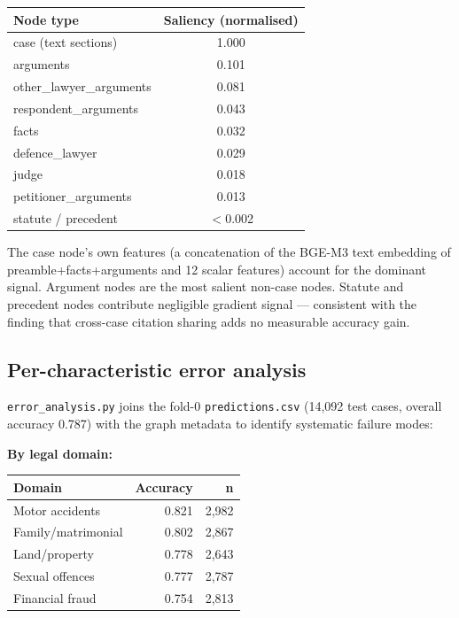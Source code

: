 \documentclass[12pt,a4paper]{article}
\begin{document}
\begin{center}
\begin{tabular}{lc}
\toprule
\textbf{Node type} & \textbf{Saliency (normalised)} \\
\midrule
case (text sections) & 1.000 \\
arguments            & 0.101 \\
other\_lawyer\_arguments & 0.081 \\
respondent\_arguments & 0.043 \\
facts                & 0.032 \\
defence\_lawyer      & 0.029 \\
judge                & 0.018 \\
petitioner\_arguments & 0.013 \\
statute / precedent  & $<$0.002 \\
\bottomrule
\end{tabular}
\end{center}

The case node's own features (a concatenation of the BGE-M3 text embedding of preamble+facts+arguments and 12 scalar features) account for the dominant signal. Argument nodes are the most salient non-case nodes. Statute and precedent nodes contribute negligible gradient signal — consistent with the finding that cross-case citation sharing adds no measurable accuracy gain.

\subsection{Per-characteristic error analysis}

\texttt{error\_analysis.py} joins the fold-0 \texttt{predictions.csv} (14{,}092 test cases, overall accuracy 0.787) with the graph metadata to identify systematic failure modes:

\textbf{By legal domain:}
\begin{center}
\begin{tabular}{lrr}
\toprule
\textbf{Domain} & \textbf{Accuracy} & \textbf{n} \\
\midrule
Motor accidents  & 0.821 & 2{,}982 \\
Family/matrimonial & 0.802 & 2{,}867 \\
Land/property    & 0.778 & 2{,}643 \\
Sexual offences  & 0.777 & 2{,}787 \\
Financial fraud  & 0.754 & 2{,}813 \\
\bottomrule
\end{tabular}
\end{center}
\end{document}
